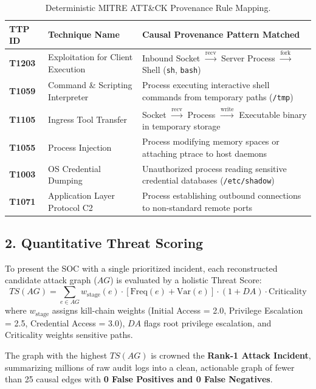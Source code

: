 \documentclass[11pt,a4paper]{report}
\begin{document}
\begin{table}[h!]
\centering
\small
\renewcommand{\arraystretch}{1.2}
\begin{tabularx}{\textwidth}{|l|l|Y|}
\hline
\textbf{TTP ID} & \textbf{Technique Name} & \textbf{Causal Provenance Pattern Matched} \\ \hline
\textbf{T1203} & Exploitation for Client Execution & Inbound Socket $\xrightarrow{\text{recv}}$ Server Process $\xrightarrow{\text{fork}}$ Shell (\texttt{sh}, \texttt{bash}) \\ \hline
\textbf{T1059} & Command \& Scripting Interpreter & Process executing interactive shell commands from temporary paths (\texttt{/tmp}) \\ \hline
\textbf{T1105} & Ingress Tool Transfer & Socket $\xrightarrow{\text{recv}}$ Process $\xrightarrow{\text{write}}$ Executable binary in temporary storage \\ \hline
\textbf{T1055} & Process Injection & Process modifying memory spaces or attaching ptrace to host daemons \\ \hline
\textbf{T1003} & OS Credential Dumping & Unauthorized process reading sensitive credential databases (\texttt{/etc/shadow}) \\ \hline
\textbf{T1071} & Application Layer Protocol C2 & Process establishing outbound connections to non-standard remote ports \\ \hline
\end{tabularx}
\caption{Deterministic MITRE ATT\&CK Provenance Rule Mapping.}
\label{tab:mitre_mapping}
\end{table}

\subsection{2. Quantitative Threat Scoring}
To present the SOC with a single prioritized incident, each reconstructed candidate attack graph ($AG$) is evaluated by a holistic Threat Score:
$$TS(AG) = \sum_{e \in AG} w_{\text{stage}}(e) \cdot \left[ \text{Freq}(e) + \text{Var}(e) \right] \cdot (1 + DA) \cdot \text{Criticality}$$
where $w_{\text{stage}}$ assigns kill-chain weights (Initial Access = 2.0, Privilege Escalation = 2.5, Credential Access = 3.0), $DA$ flags root privilege escalation, and $\text{Criticality}$ weights sensitive paths.

The graph with the highest $TS(AG)$ is crowned the \textbf{Rank-1 Attack Incident}, summarizing millions of raw audit logs into a clean, actionable graph of fewer than 25 causal edges with \textbf{0 False Positives and 0 False Negatives}.
\end{document}
